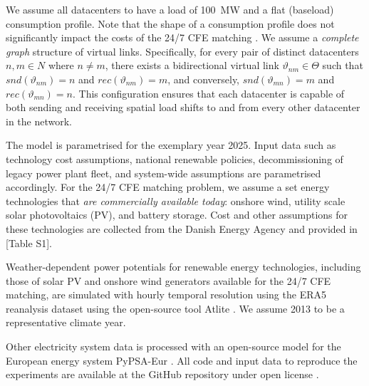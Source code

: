 We assume all datacenters to have a load of 100~MW and a flat (baseload) consumption profile. Note that the shape of a consumption profile does not significantly impact the costs of the 24/7 CFE matching \cite{riepin-zenodo-systemlevel247}. We assume a \textit{complete graph} structure of virtual links. Specifically, for every pair of distinct datacenters \(n, m \in N\) where \(n \neq m\), there exists a bidirectional virtual link \(\vartheta_{nm} \in \Theta\) such that \(snd(\vartheta_{nm}) = n\) and \(rec(\vartheta_{nm}) = m\), and conversely, \(snd(\vartheta_{mn}) = m\) and \(rec(\vartheta_{mn}) = n\). This configuration ensures that each datacenter is capable of both sending and receiving spatial load shifts to and from every other datacenter in the network.

The model is parametrised for the exemplary year 2025. Input data such as technology cost assumptions, national renewable policies, decommissioning of legacy power plant fleet, and system-wide assumptions are parametrised accordingly. For the 24/7 CFE matching problem, we assume a set energy technologies that \textit{are commercially available today}: onshore wind, utility scale solar photovoltaics (\gls{PV}), and battery storage. Cost and other assumptions for these technologies are collected from the Danish Energy Agency \cite{DEA-technologydata} and provided in [Table S1].

Weather-dependent power potentials for renewable energy technologies, including those of solar \gls{PV} and onshore wind generators available for the 24/7 CFE matching, are simulated with hourly temporal resolution using the ERA5 reanalysis dataset \cite{hersbachERA5GlobalReanalysis2020} using the open-source tool Atlite \cite{atlite-github}. We assume 2013 to be a representative climate year.

Other electricity system data is processed with an open-source model for the European energy system PyPSA-Eur \cite{PyPSAEur-docs}. All code and input data to reproduce the experiments are available at the GitHub repository under open license \cite{github-spacetime}.



